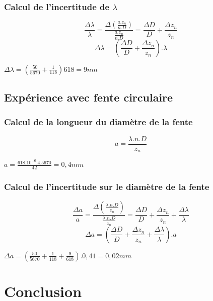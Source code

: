 \documentclass[11pt,a4paper]{report}
\begin{document}
		\subsubsection{Calcul de l'incertitude de $\lambda$}
		\begin{equation}
		\frac{\Delta \lambda}{\lambda} = \frac{\Delta\left(\frac{a.z_{n}}{n.D}\right)}{\frac{a.z_{n}}{n.D}} 
		= \frac{\Delta D}{D}+\frac{\Delta z_{n}}{z_{n}}
		\end{equation}
		\begin{equation}
		\Delta \lambda
		= \left(\frac{\Delta D}{D}+\frac{\Delta z_{n}}{z_{n}}\right).\lambda
		\end{equation}
		\begin{center}
		$\Delta \lambda = \left(\frac{50}{5670}+\frac{1}{118}\right) 618 = 9 nm$
		\end{center}
		\subsection{Expérience avec fente circulaire}
		\subsubsection{Calcul de la longueur du diamètre de la fente}
		\begin{equation}
		a = \frac{\lambda.n.D}{z_{n}}
		\end{equation}
		\begin{center}
		$a = \frac{618.10^{-6}.4.5670}{42} = 0,4 mm$
		\end{center}
		\subsubsection{Calcul de l'incertitude sur le diamètre de la fente}
		\begin{equation}
		\frac{\Delta a}{a} =\frac{\Delta\left(\frac{\lambda.n.D}{z_{n}}\right)}{ \frac{\lambda.n.D}{z_{n}}} = \frac{\Delta D}{D}+\frac{\Delta z_{n}}{z_{n}}+ \frac{\Delta \lambda}{\lambda}
		\end{equation}
		\begin{equation}
		\Delta a = \left(\frac{\Delta D}{D}+\frac{\Delta z_{n}}{z_{n}}+\frac{\Delta \lambda}{\lambda}\right).a
		\end{equation}
		\begin{center}
		$\Delta a = \left(\frac{50}{5670}+\frac{1}{118}+\frac{9}{618}\right).0,41 = 0,02 mm$
		\end{center}
	\section{Conclusion}
\end{document}
